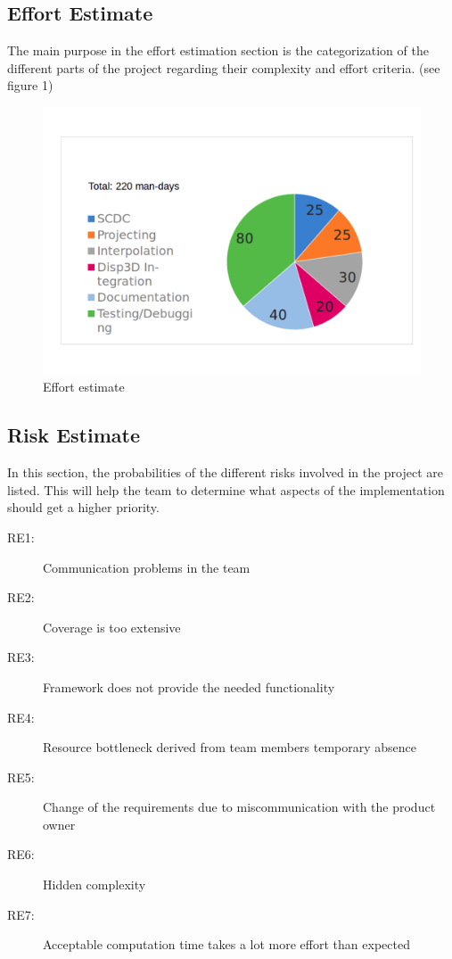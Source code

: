 \subsection{Effort Estimate}
The main purpose in the effort estimation section is the categorization of the different parts of the project regarding their complexity and effort criteria.  
 (see figure 1)

\begin{figure}[h]
	\begin{center}
		\includegraphics[width= 14cm]{figures/Aufwandsabschaetzung.pdf}
		\caption{Effort estimate}
	\end{center}
\end{figure}

\clearpage

\subsection{Risk Estimate}
In this section, the probabilities of the different risks involved in the project are listed. This will help the team to determine what aspects of the implementation should get a higher priority.

\begin{description}
	\item[RE1:] Communication problems in the team
	\item[RE2:] Coverage is too extensive
	\item[RE3:] Framework does not provide the needed functionality 
	\item[RE4:] Resource bottleneck derived from team members temporary absence 
	\item[RE5:] Change of the requirements due to miscommunication with the product owner 
	\item[RE6:] Hidden complexity 
	\item[RE7:] Acceptable computation time takes a lot more effort than expected  
\end{description}


